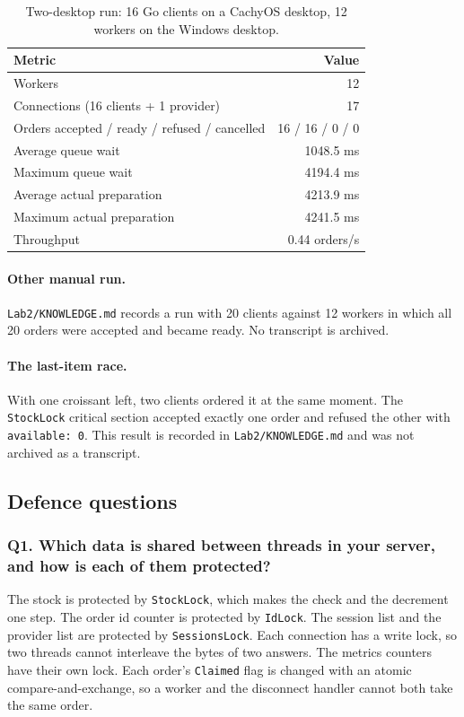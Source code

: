 \documentclass[12pt,a4paper]{article}
\begin{document}
\begin{table}[H]
\centering
\small
\begin{tabularx}{\textwidth}{@{}X r@{}}
\toprule
Metric & Value \\
\midrule
Workers & 12 \\
Connections (16 clients + 1 provider) & 17 \\
Orders accepted / ready / refused / cancelled & 16 / 16 / 0 / 0 \\
Average queue wait & 1048.5 ms \\
Maximum queue wait & 4194.4 ms \\
Average actual preparation & 4213.9 ms \\
Maximum actual preparation & 4241.5 ms \\
Throughput & 0.44 orders/s \\
\bottomrule
\end{tabularx}
\caption{Two-desktop run: 16 Go clients on a CachyOS desktop, 12 workers on the Windows desktop.}
\label{tab:twodesktop}
\end{table}

\paragraph{Other manual run.} \texttt{Lab2/KNOWLEDGE.md} records a run with 20 clients
against 12 workers in which all 20 orders were accepted and became ready. No transcript
is archived.

\paragraph{The last-item race.} With one croissant left, two clients ordered it at
the same moment. The \texttt{StockLock} critical section accepted exactly one order
and refused the other with \texttt{available: 0}. This result is recorded in
\texttt{Lab2/KNOWLEDGE.md} and was not archived as a transcript.

\subsection{Defence questions}

    \subsubsection{Q1. Which data is shared between threads in your server, and how is each of them protected?}
    The stock is protected by \texttt{StockLock}, which makes the check and the
    decrement one step. The order id counter is protected by \texttt{IdLock}. The
    session list and the provider list are protected by \texttt{SessionsLock}. Each
    connection has a write lock, so two threads cannot interleave the bytes of two
    answers. The metrics counters have their own lock. Each order's \texttt{Claimed}
    flag is changed with an atomic compare-and-exchange, so a worker and the disconnect
    handler cannot both take the same order.
\end{document}
